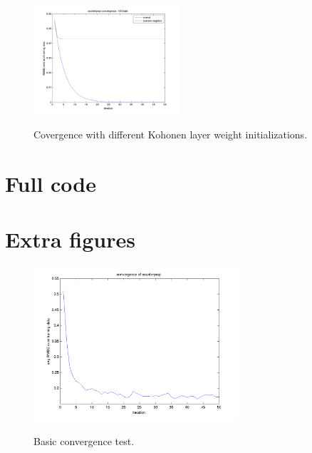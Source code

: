 \documentclass[pre,twocolumn,twoside,byrevtex,superscriptaddress]{revtex4}
\begin{document}
\begin{figure}[h]
 \centering
  \includegraphics[width=0.48\textwidth]{119.png}
  \label{fig:9}
  \caption{Covergence with different Kohonen layer weight initializations.}
\end{figure}

\clearpage
\pagebreak




\clearpage
\pagebreak
\onecolumngrid

    \section*{Full code}

    

    

    

    

    

    

\clearpage
\pagebreak

    \section*{Extra figures}

    \begin{figure}
      \centering
      \includegraphics[width=0.68\textwidth]{111.png}
      \label{fig:1}
      \caption{Basic convergence test.}
    \end{figure}
\end{document}
